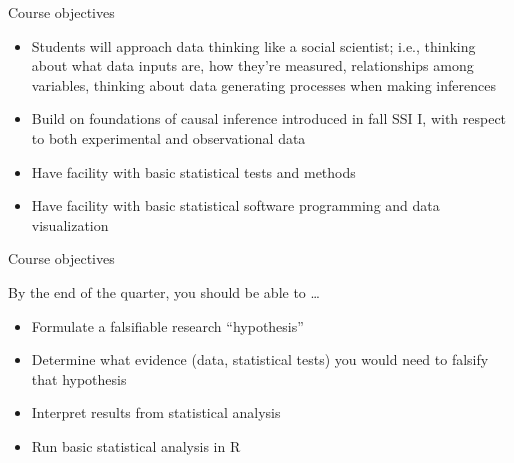 \documentclass[xcolor={dvipsnames}]{beamer}
\begin{document}
\begin{frame}{Course objectives}
\pause
\begin{itemize}
\item Students will approach data thinking like a social scientist; i.e., thinking about what data inputs are, how they’re measured, relationships among variables, thinking about data generating processes when making inferences\pause
\item Build on foundations of causal inference introduced in fall SSI I, with respect to both experimental and observational data \pause
\item Have facility with basic statistical tests and methods \pause
\item Have facility with basic statistical software programming and data visualization 
\end{itemize}

\end{frame}



\begin{frame}{Course objectives}

By the end of the quarter, you should be able to \dots\pause
\begin{itemize}
\item Formulate a falsifiable research ``hypothesis'' \pause
\item Determine what evidence (data, statistical tests) you would need to falsify that hypothesis \pause
\item Interpret results from statistical analysis \pause
\item Run basic statistical analysis in R
\end{itemize}

\end{frame}


\end{document}
